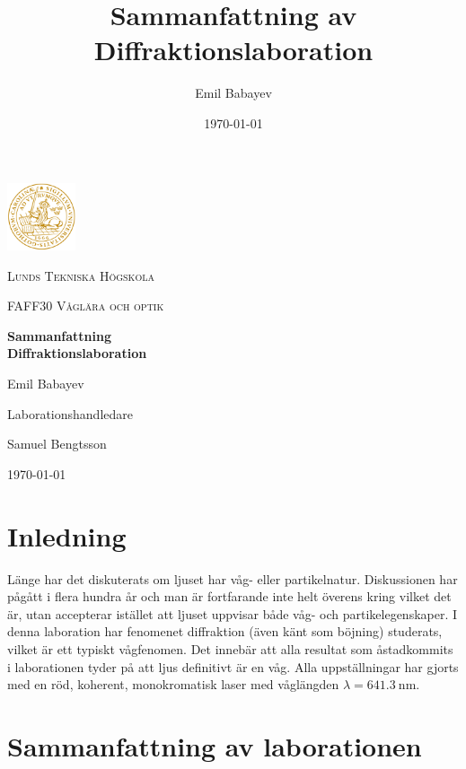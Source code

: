 \documentclass[a4paper]{article}
\title{Sammanfattning av Diffraktionslaboration}
\author{Emil Babayev}
\date{\today}
\begin{document}
\begin{titlepage}
	\centering
	\includegraphics[width=0.15\textwidth]{logo.png}\par\vspace{1cm}
	{\scshape\large Lunds Tekniska Högskola \par}
	\vspace{1cm}
    {\scshape\large FAFF30 Våglära och optik\par}
	\vspace{1.5cm}
	{\huge\bfseries Sammanfattning\\Diffraktionslaboration\par}
	\vspace{2cm}
	{\Large Emil Babayev\par}
	\vfill
	Laborationshandledare\par
    Samuel Bengtsson

    \vfill
    
	{\large \today \par}
\end{titlepage}

\section{Inledning}
Länge har det diskuterats om ljuset har våg- eller partikelnatur. Diskussionen har pågått i flera hundra år och man är fortfarande inte helt överens kring vilket det är,
utan accepterar istället att ljuset uppvisar både våg- och partikelegenskaper. I denna laboration har fenomenet diffraktion (även känt som böjning) studerats, vilket är 
ett typiskt vågfenomen. Det innebär att alla resultat som åstadkommits i laborationen tyder på att ljus definitivt är en våg. Alla uppställningar har gjorts med en
röd, koherent, monokromatisk laser med våglängden $\lambda = \SI{641.3}{\nano\meter}$.

\section{Sammanfattning av laborationen}
\end{document}
